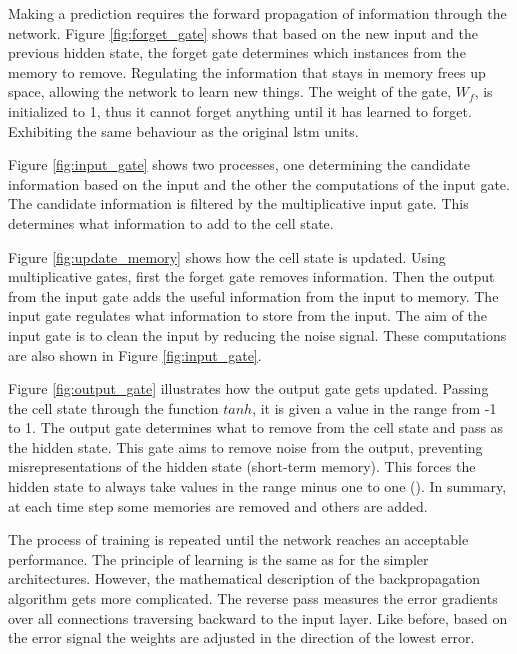 Making a prediction requires the forward propagation of information through the network. Figure \ref{fig:forget_gate} shows that based on the new input and the previous hidden state, the forget gate determines which instances from the memory to remove. Regulating the information that stays in memory frees up space, allowing the network to learn new things. The weight of the gate, $W_f$, is initialized to 1, thus it cannot forget anything until it has learned to forget. Exhibiting the same behaviour as the original \acrshort{lstm} units. 

Figure \ref{fig:input_gate} shows two processes, one determining the candidate information based on the input and the other the computations of the input gate. The candidate information is filtered by the multiplicative input gate. This determines what information to add to the cell state.

Figure \ref{fig:update_memory} shows how the cell state is updated. Using multiplicative gates, first the forget gate removes information. Then the output from the input gate adds the useful information from the input to memory. The input gate regulates what information to store from the input. The aim of the input gate is to clean the input by reducing the noise signal. These computations are also shown in Figure \ref{fig:input_gate}.

Figure \ref{fig:output_gate} illustrates how the output gate gets updated. Passing the cell state through the function $tanh$, it is given a value in the range from -1 to 1. The output gate determines what to remove from the cell state and pass as the hidden state. This gate aims to remove noise from the output, preventing misrepresentations of the hidden state (short-term memory). This forces the hidden state to always take values in the range minus one to one (\cite{Hochreiter1997LongMemory}).  In summary, at each time step some memories are removed and others are added. 

The process of training is repeated until the network reaches an acceptable performance. The principle of learning is the same as for the simpler architectures. However, the mathematical description of the backpropagation algorithm gets more complicated. The reverse pass measures the error gradients over all connections traversing backward to the input layer. Like before, based on the error signal the weights are adjusted in the direction of the lowest error.

\clearpage
